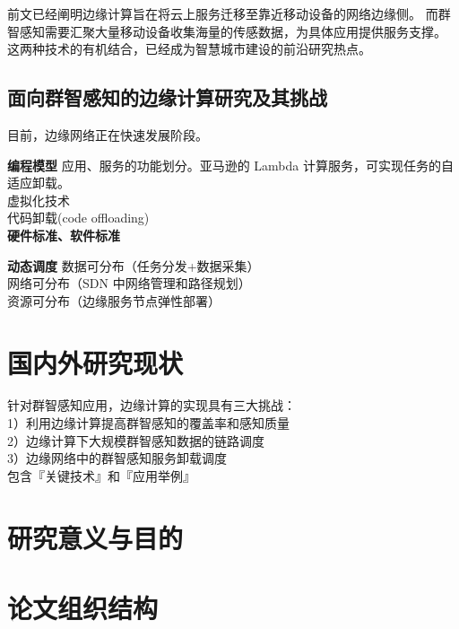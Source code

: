 前文已经阐明边缘计算旨在将云上服务迁移至靠近移动设备的网络边缘侧。
而群智感知需要汇聚大量移动设备收集海量的传感数据，为具体应用提供服务支撑。
这两种技术的有机结合，已经成为智慧城市建设的前沿研究热点。

\subsection{面向群智感知的边缘计算研究及其挑战}
目前，边缘网络正在快速发展阶段。


\textbf{编程模型}
应用、服务的功能划分。亚马逊的 Lambda 计算服务，可实现任务的自适应卸载。\\
虚拟化技术\\
代码卸载(code offloading)\\

\textbf{硬件标准、软件标准}

\textbf{动态调度}
数据可分布（任务分发+数据采集）\\
网络可分布（SDN 中网络管理和路径规划）\\
资源可分布（边缘服务节点弹性部署）\\

\section{国内外研究现状}

针对群智感知应用，边缘计算的实现具有三大挑战：\\
1）利用边缘计算提高群智感知的覆盖率和感知质量\\
2）边缘计算下大规模群智感知数据的链路调度\\
3）边缘网络中的群智感知服务卸载调度\\

包含『关键技术』和『应用举例』

\section{研究意义与目的}

\section{论文组织结构}
